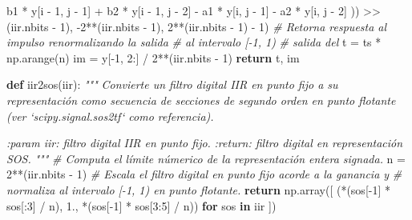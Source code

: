 \documentclass[11pt]{article}
\newenvironment{Shaded}{}{}
\newcommand{\KeywordTok}[1]{\textcolor[rgb]{0.00,0.44,0.13}{\textbf{{#1}}}}
\newcommand{\DecValTok}[1]{\textcolor[rgb]{0.25,0.63,0.44}{{#1}}}
\newcommand{\FloatTok}[1]{\textcolor[rgb]{0.25,0.63,0.44}{{#1}}}
\newcommand{\CommentTok}[1]{\textcolor[rgb]{0.38,0.63,0.69}{\textit{{#1}}}}
\newcommand{\NormalTok}[1]{{#1}}
\newcommand{\ControlFlowTok}[1]{\textcolor[rgb]{0.00,0.44,0.13}{\textbf{{#1}}}}
\newcommand{\OperatorTok}[1]{\textcolor[rgb]{0.40,0.40,0.40}{{#1}}}
\begin{document}
\begin{Shaded}
\begin{Highlighting}[]
\NormalTok{                b1 }\OperatorTok{*}\NormalTok{ y[i }\OperatorTok{-} \DecValTok{1}\NormalTok{, j }\OperatorTok{-} \DecValTok{1}\NormalTok{] }\OperatorTok{+}
\NormalTok{                b2 }\OperatorTok{*}\NormalTok{ y[i }\OperatorTok{-} \DecValTok{1}\NormalTok{, j }\OperatorTok{-} \DecValTok{2}\NormalTok{] }\OperatorTok{-}
\NormalTok{                a1 }\OperatorTok{*}\NormalTok{ y[i, j }\OperatorTok{-} \DecValTok{1}\NormalTok{] }\OperatorTok{-}
\NormalTok{                a2 }\OperatorTok{*}\NormalTok{ y[i, j }\OperatorTok{-} \DecValTok{2}\NormalTok{]}
\NormalTok{            )) }\OperatorTok{>>}\NormalTok{ (iir.nbits }\OperatorTok{-} \DecValTok{1}\NormalTok{), }\DecValTok{-2}\OperatorTok{**}\NormalTok{(iir.nbits }\OperatorTok{-} \DecValTok{1}\NormalTok{), }\DecValTok{2}\OperatorTok{**}\NormalTok{(iir.nbits }\OperatorTok{-} \DecValTok{1}\NormalTok{) }\OperatorTok{-} \DecValTok{1}\NormalTok{)}
    \CommentTok{# Retorna respuesta al impulso renormalizando la salida}
    \CommentTok{# al intervalo [-1, 1)}
    \CommentTok{# salida del}
\NormalTok{    t }\OperatorTok{=}\NormalTok{ ts }\OperatorTok{*}\NormalTok{ np.arange(n)}
\NormalTok{    im }\OperatorTok{=}\NormalTok{ y[}\OperatorTok{-}\DecValTok{1}\NormalTok{, }\DecValTok{2}\NormalTok{:] }\OperatorTok{/} \DecValTok{2}\OperatorTok{**}\NormalTok{(iir.nbits }\OperatorTok{-} \DecValTok{1}\NormalTok{)}
    \ControlFlowTok{return}\NormalTok{ t, im}


\KeywordTok{def}\NormalTok{ iir2sos(iir):}
    \CommentTok{"""}
\CommentTok{    Convierte un filtro digital IIR en punto fijo a su representación}
\CommentTok{    como secuencia de secciones de segundo orden en punto flotante (ver}
\CommentTok{    `scipy.signal.sos2tf` como referencia).}

\CommentTok{    :param iir: filtro digital IIR en punto fijo.}
\CommentTok{    :return: filtro digital en representación SOS.}
\CommentTok{    """}
    \CommentTok{# Computa el límite númerico de la representación entera signada.}
\NormalTok{    n }\OperatorTok{=} \DecValTok{2}\OperatorTok{**}\NormalTok{(iir.nbits }\OperatorTok{-} \DecValTok{1}\NormalTok{)}
    \CommentTok{# Escala el filtro digital en punto fijo acorde a la ganancia y}
    \CommentTok{# normaliza al intervalo [-1, 1) en punto flotante.}
    \ControlFlowTok{return}\NormalTok{ np.array([}
\NormalTok{        (}\OperatorTok{*}\NormalTok{(sos[}\OperatorTok{-}\DecValTok{1}\NormalTok{] }\OperatorTok{*}\NormalTok{ sos[:}\DecValTok{3}\NormalTok{] }\OperatorTok{/}\NormalTok{ n), }\FloatTok{1.}\NormalTok{,}
         \OperatorTok{*}\NormalTok{(sos[}\OperatorTok{-}\DecValTok{1}\NormalTok{] }\OperatorTok{*}\NormalTok{ sos[}\DecValTok{3}\NormalTok{:}\DecValTok{5}\NormalTok{] }\OperatorTok{/}\NormalTok{ n))}
        \ControlFlowTok{for}\NormalTok{ sos }\KeywordTok{in}\NormalTok{ iir}
\NormalTok{    ])}



\end{Highlighting}
\end{Shaded}
\end{document}
